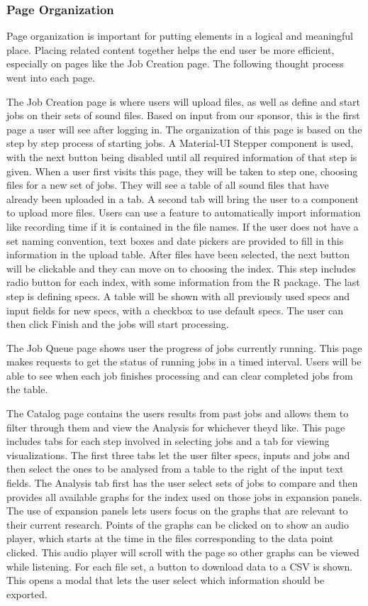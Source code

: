 \subsubsection{Page Organization}
Page organization is important for putting elements in a logical and meaningful place. Placing related content together helps the end user be more efficient, especially on pages like the Job Creation page. The following thought process went into each page.\par
The Job Creation page is where users will upload files, as well as define and start jobs on their sets of sound files. Based on input from our sponsor, this is the first page a user will see after logging in. The organization of this page is based on the step by step process of starting jobs. A Material-UI Stepper component is used, with the next button being disabled until all required information of that step is given. When a user first visits this page, they will be taken to step one, choosing files for a new set of jobs. They will see a table of all sound files that have already been uploaded in a tab. A second tab will bring the user to a component to upload more files. Users can use a feature to automatically import information like recording time if it is contained in the file names. If the user does not have a set naming convention, text boxes and date pickers are provided to fill in this information in the upload table. After files have been selected, the next button will be clickable and they can move on to choosing the index. This step includes radio button for each index, with some information from the R  package. The last step is defining specs. A table will be shown with all previously used specs and input fields for new specs, with a checkbox to use default specs. The user can then click Finish and the jobs will start processing.\par
The Job Queue page shows user the progress of jobs currently running. This page makes requests to get the status of running jobs in a timed interval. Users will be able to see when each job finishes processing and can clear completed jobs from the table.\par 
The Catalog page contains the user\textquotesingle s results from past jobs and allows them to filter through them and view the Analysis for whichever they\textquotesingle d like. This page includes tabs for each step involved in selecting jobs and a tab for viewing visualizations. The first three tabs let the user filter specs, inputs and jobs and then select the ones to be analysed from a table to the right of the input text fields. The Analysis tab first has the user select sets of jobs to compare and then provides all available graphs for the index used on those jobs in expansion panels. The use of expansion panels lets users focus on the graphs that are relevant to their current research. Points of the graphs can be clicked on to show an audio player, which starts at the time in the files corresponding to the data point clicked. This audio player will scroll with the page so other graphs can be viewed while listening. For each file set, a button to download data to a CSV is shown. This opens a modal that lets the user select which information should be exported.\par

